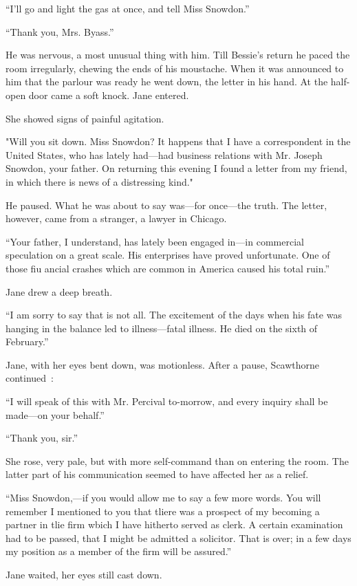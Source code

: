 ``I'll go and light the gas at once, and tell Miss Snowdon.''

``Thank you, Mrs. Byass.''

He was nervous, a most unusual thing with him. Till Bessie's return he
paced the room irregularly, chewing the ends of his moustache. When it
was announced to him that the parlour was ready he went down, the letter
in his hand. At the half-open door came a soft knock. Jane entered.

She showed signs of painful agitation.

"Will you sit down. Miss Snowdon? It happens that I have a correspondent
in the United States, who has lately had---had business relations with
Mr. Joseph Snowdon, your {} father. On returning this evening I found a
letter from my friend, in which there is news of a distressing kind."

He paused. What he was about to say was---for once---the truth. The
letter, however, came from a stranger, a lawyer in Chicago.

``Your father, I understand, has lately been engaged in---in commercial
speculation on a great scale. His enterprises have proved unfortunate.
One of those fiu ancial crashes which are common in America caused his
total ruin.''

Jane drew a deep breath.

``I am sorry to say that is not all. The excitement of the days when his
fate was hanging in the balance led to illness---fatal illness. He died
on the sixth of February.''

Jane, with her eyes bent down, was motionless. After a pause, Scawthorne
continued~:

``I will speak of this with Mr. Percival to-morrow, and every inquiry
shall be made---on your behalf.''

``Thank you, sir.''

She rose, very pale, but with more self-command than on entering the
room. The latter part of his communication seemed to have affected her
as a relief.

{} ``Miss Snowdon,---if you would allow me to say a few more words. You
will remember I mentioned to you that tliere was a prospect of my
becoming a partner in tlie firm wbich I have hitherto served as clerk. A
certain examination had to be passed, that I might be admitted a
solicitor. That is over; in a few days my position as a member of the
firm will be assured.''

Jane waited, her eyes still cast down.

